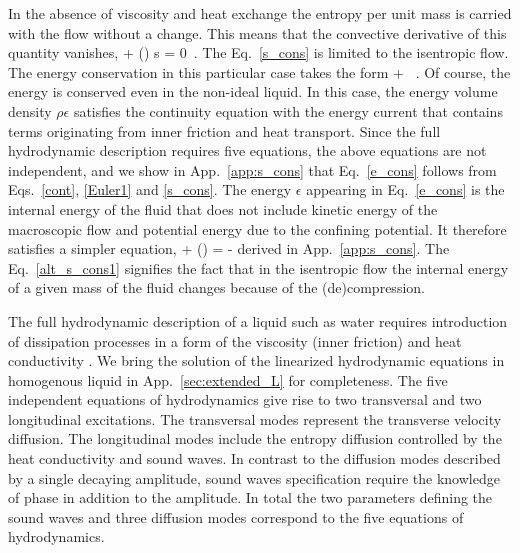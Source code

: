 In the absence of viscosity and heat exchange the entropy per unit mass is carried with the flow without a change.
This means that the convective derivative of this quantity vanishes,
\be\label{s_cons}
 \equiv {} + (\cdot \bm{\nabla}) s = 0\, .
\ee
The Eq.~\eqref{s_cons} is limited to the isentropic flow.
The energy conservation in this particular case takes the form 
\be\label{e_cons}
 + \bm{\nabla}\cdot {}\, .
\ee
Of course, the energy is conserved even in the non-ideal liquid.
In this case, the energy volume density $\rho \epsilon$ satisfies the continuity equation with the energy current that contains terms originating from inner friction and heat transport.
Since the full hydrodynamic description requires five equations, the above equations are not independent, and we show in App.~\ref{app:s_cons} that Eq.~\eqref{e_cons} follows from Eqs.~\eqref{cont}, \eqref{Euler1} and \eqref{s_cons}. 
The energy $\epsilon$ appearing in Eq.~\eqref{e_cons} is the internal energy of the fluid that does not include kinetic energy of the macroscopic flow and potential energy due to the confining potential.
It therefore satisfies a simpler equation,  
\be\label{alt_s_cons1}
 + (\cdot \bm{\nabla}) \epsilon= -  \bm{\nabla} \cdot {} 
\ee
derived in App.~\ref{app:s_cons}.
The Eq.~\eqref{alt_s_cons1} signifies the fact that in the isentropic flow the 
internal
energy of a given mass of the fluid changes because of the (de)compression.

The full hydrodynamic description of a liquid such as water requires introduction of dissipation processes in a form of the viscosity (inner friction) and heat conductivity \cite{Forster1975}.
We bring the solution of the linearized hydrodynamic equations in homogenous liquid in App.~\ref{sec:extended_L} for completeness.
The five independent equations of hydrodynamics give rise to two transversal and two longitudinal excitations.
The transversal modes represent the transverse velocity diffusion.
The longitudinal modes include the entropy diffusion controlled by the heat conductivity and sound waves.
In contrast to the diffusion modes described by a single decaying amplitude, sound waves specification require the knowledge of phase in addition to the amplitude.
In total the two parameters defining the sound waves and three diffusion modes correspond to the five equations of hydrodynamics.


